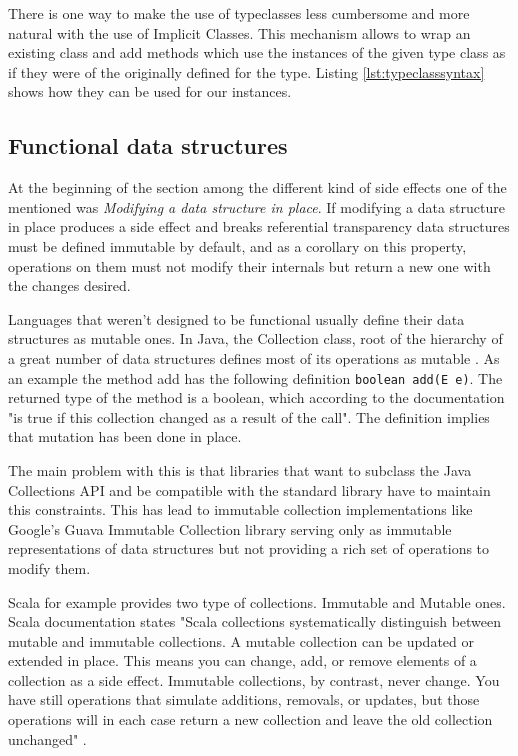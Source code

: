 \documentclass[../main.tex]{subfiles}
\begin{document}
There is one way to make the use of typeclasses less cumbersome and more natural
with the use of Implicit Classes. This mechanism allows to wrap an existing
class and add methods which use the instances of the given type class as if they
were of the originally defined for the type. Listing \ref{lst:typeclasssyntax}
shows how they can be used for our instances.

\subsection{Functional data structures} At the beginning of the section among
the different kind of side effects one of the mentioned was \textit{Modifying a
data structure in place}. If modifying a data structure in place produces a side
effect and breaks referential transparency data structures must be defined
immutable by default, and as a corollary on this property, operations on them
must not modify their internals but return a new one with the changes desired.

Languages that weren't designed to be functional usually define their data
structures as mutable ones. In Java, the Collection class, root of the hierarchy
of a great number of data structures defines most of its operations as mutable
\autocite{Collection}. As an example the method add has the following definition
\texttt{boolean add(E e)}. The returned type of the method is a boolean, which
according to the documentation "is true if this collection changed as a result
of the call". The definition implies that mutation has been done in place.

The main problem with this is that libraries that want to subclass the Java
Collections API and be compatible with the standard library have to maintain
this constraints. This has lead to immutable collection implementations like
Google's Guava Immutable Collection library \autocite{ImmutableCollectionAPI}
serving only as immutable representations of data structures but not providing a
rich set of operations to modify them.

Scala for example provides two type of collections. Immutable and Mutable ones.
Scala documentation states "Scala collections systematically distinguish between
mutable and immutable collections. A mutable collection can be updated or
extended in place. This means you can change, add, or remove elements of a
collection as a side effect. Immutable collections, by contrast, never change.
You have still operations that simulate additions, removals, or updates, but
those operations will in each case return a new collection and leave the old
collection unchanged" \autocite{MutableDocumentation}.
\end{document}
